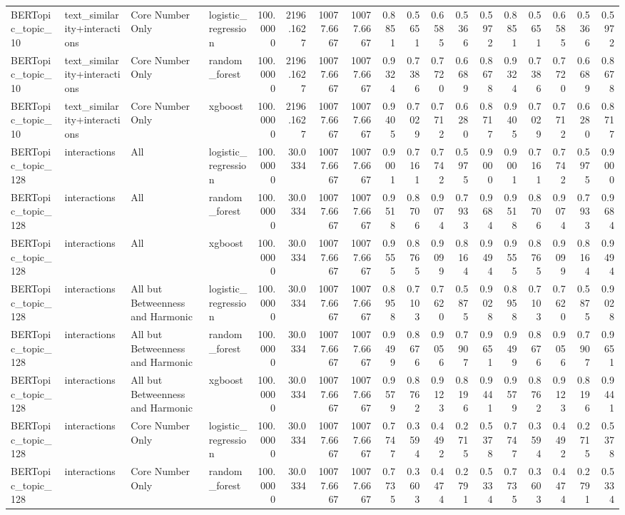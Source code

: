 \begin{tabular}{llllrrrrrrrrrrrrrr}
BERTopic_topic_10 & text_similarity+interactions & Core Number Only & logistic_regression & 100.0000 & 2196.1627 & 10077.6667 & 10077.6667 & 0.8851 & 0.5651 & 0.6585 & 0.5366 & 0.5972 & 0.8851 & 0.5651 & 0.6585 & 0.5366 & 0.5972 \\
BERTopic_topic_10 & text_similarity+interactions & Core Number Only & random_forest & 100.0000 & 2196.1627 & 10077.6667 & 10077.6667 & 0.9324 & 0.7386 & 0.7720 & 0.6689 & 0.8678 & 0.9324 & 0.7386 & 0.7720 & 0.6689 & 0.8678 \\
BERTopic_topic_10 & text_similarity+interactions & Core Number Only & xgboost & 100.0000 & 2196.1627 & 10077.6667 & 10077.6667 & 0.9405 & 0.7029 & 0.7712 & 0.6280 & 0.8717 & 0.9405 & 0.7029 & 0.7712 & 0.6280 & 0.8717 \\
BERTopic_topic_128 & interactions & All & logistic_regression & 100.0000 & 30.0334 & 10077.6667 & 10077.6667 & 0.9001 & 0.7161 & 0.7742 & 0.5975 & 0.9000 & 0.9001 & 0.7161 & 0.7742 & 0.5975 & 0.9000 \\
BERTopic_topic_128 & interactions & All & random_forest & 100.0000 & 30.0334 & 10077.6667 & 10077.6667 & 0.9518 & 0.8706 & 0.9074 & 0.7933 & 0.9684 & 0.9518 & 0.8706 & 0.9074 & 0.7933 & 0.9684 \\
BERTopic_topic_128 & interactions & All & xgboost & 100.0000 & 30.0334 & 10077.6667 & 10077.6667 & 0.9555 & 0.8765 & 0.9099 & 0.8164 & 0.9494 & 0.9555 & 0.8765 & 0.9099 & 0.8164 & 0.9494 \\
BERTopic_topic_128 & interactions & All but Betweenness and Harmonic & logistic_regression & 100.0000 & 30.0334 & 10077.6667 & 10077.6667 & 0.8958 & 0.7103 & 0.7620 & 0.5875 & 0.9028 & 0.8958 & 0.7103 & 0.7620 & 0.5875 & 0.9028 \\
BERTopic_topic_128 & interactions & All but Betweenness and Harmonic & random_forest & 100.0000 & 30.0334 & 10077.6667 & 10077.6667 & 0.9499 & 0.8676 & 0.9056 & 0.7907 & 0.9651 & 0.9499 & 0.8676 & 0.9056 & 0.7907 & 0.9651 \\
BERTopic_topic_128 & interactions & All but Betweenness and Harmonic & xgboost & 100.0000 & 30.0334 & 10077.6667 & 10077.6667 & 0.9579 & 0.8762 & 0.9123 & 0.8196 & 0.9441 & 0.9579 & 0.8762 & 0.9123 & 0.8196 & 0.9441 \\
BERTopic_topic_128 & interactions & Core Number Only & logistic_regression & 100.0000 & 30.0334 & 10077.6667 & 10077.6667 & 0.7747 & 0.3594 & 0.4492 & 0.2715 & 0.5378 & 0.7747 & 0.3594 & 0.4492 & 0.2715 & 0.5378 \\
BERTopic_topic_128 & interactions & Core Number Only & random_forest & 100.0000 & 30.0334 & 10077.6667 & 10077.6667 & 0.7735 & 0.3603 & 0.4474 & 0.2791 & 0.5334 & 0.7735 & 0.3603 & 0.4474 & 0.2791 & 0.5334 \\

\end{tabular}
